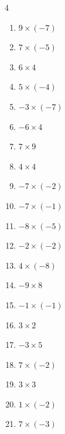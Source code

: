\begin{multicols}{4}
\begin{enumerate}
  \item $9\times (-7)$
        \phantom{$=-63$}

  \item $7\times (-5)$
        \phantom{$=-35$}

  \item $6\times 4$
        \phantom{$=24$}

  \item $5\times (-4)$
        \phantom{$=-20$}

  \item $-3\times (-7)$
        \phantom{$=21$}

  \item $-6\times 4$
        \phantom{$=-24$}

  \item $7\times 9$
        \phantom{$=63$}

  \item $4\times 4$
        \phantom{$=16$}

  \item $-7\times (-2)$
        \phantom{$=14$}

  \item $-7\times (-1)$
        \phantom{$=7$}

  \item $-8\times (-5)$
        \phantom{$=40$}

  \item $-2\times (-2)$
        \phantom{$=4$}

  \item $4\times (-8)$
        \phantom{$=-32$}

  \item $-9\times 8$
        \phantom{$=-72$}

  \item $-1\times (-1)$
        \phantom{$=1$}

  \item $3\times 2$
        \phantom{$=6$}

  \item $-3\times 5$
        \phantom{$=-15$}

  \item $7\times (-2)$
        \phantom{$=-14$}

  \item $3\times 3$
        \phantom{$=9$}

  \item $1\times (-2)$
        \phantom{$=-2$}

  \item $7\times (-3)$
        \phantom{$=-21$}

\end{enumerate}
\end{multicols}

